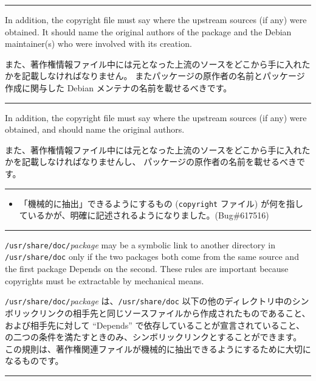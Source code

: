 \documentclass[mingoth,a4paper]{jsarticle}
\begin{document}
\vspace{1ex}
\hrule
{}\par
\parbox{0.48\linewidth}{
	  In addition, the copyright file must say where the upstream
	  sources (if any) were obtained.  It should name the original
	  authors of the package and the Debian maintainer(s) who were
	  involved with its creation.
}\hfil 
\parbox{0.48\linewidth}{
	  また、著作権情報ファイル中には元となった上流のソースをどこから手に入れたかを記載しなければなりません。
	  またパッケージの原作者の名前とパッケージ作成に関与した
	  Debian メンテナの名前を載せるべきです。
}
\hrule

\par
\parbox{0.48\linewidth}{
	  In addition, the copyright file must say where the upstream
	  sources (if any) were obtained, and should name the original
	  authors.
}\hfil 
\parbox{0.48\linewidth}{
	  また、著作権情報ファイル中には元となった上流のソースをどこから手に入れたかを記載しなければなりませんし、
	  パッケージの原作者の名前を載せるべきです。
}
\hrule
\vspace{1ex}

\begin{itemize}
\item 「機械的に抽出」できるようにするもの ({\tt copyright} ファイル) が何を指しているかが、明確に記述されるようになりました。(Bug\#617516)
\end{itemize}

\vspace{1ex}
\hrule
{}\par
\parbox{0.48\linewidth}{
	  {\tt /usr/share/doc/}{\it package} may be a symbolic
	  link to another directory in {\tt /usr/share/doc} only if
	  the two packages both come from the same source and the
	  first package Depends on the second.  These rules are
	  important because copyrights must be extractable by
	  mechanical means.
}\hfil 
\parbox{0.48\linewidth}{
	  {\tt/usr/share/doc/}{\it package}
	  は、{\tt /usr/share/doc}
	  以下の他のディレクトリ中のシンボリックリンクの相手先と同じソースファイルから作成されたものであること、および相手先に対して
	  ``Depends'' で依存していることが宣言されていること、の二つの条件を満たすときのみ、シンボリックリンクとすることができます。
	  この規則は、著作権関連ファイルが機械的に抽出できるようにするために大切になるものです。
}
\hrule

\clearpage
\end{document}
